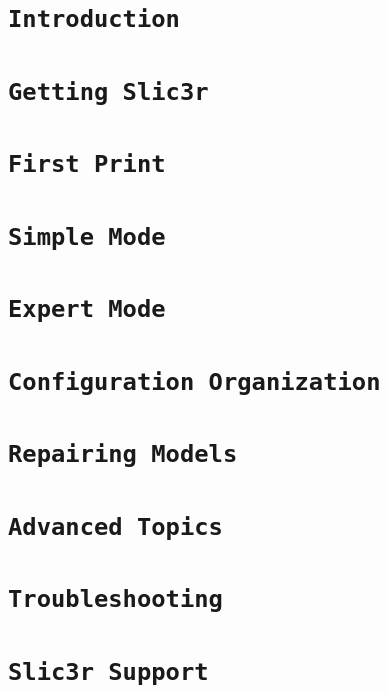%
%
%
%
%

\section{\texttt{Introduction}}


\section{\texttt{Getting Slic3r}}


\section{\texttt{First Print}}


\section{\texttt{Simple Mode}}


\section{\texttt{Expert Mode}}


\section{\texttt{Configuration Organization}}


\section{\texttt{Repairing Models}}


\section{\texttt{Advanced Topics}}


\section{\texttt{Troubleshooting}}


\section{\texttt{Slic3r Support}}


